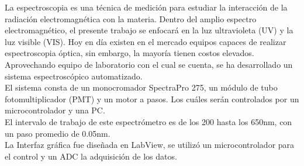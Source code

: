 \tableofcontents
\listoffigures
\listoftables
{}
La espectroscopia es una técnica de medición para estudiar la interacción de la radiación electromagnética con la materia.
Dentro del amplio espectro electromagnético, el presente trabajo se enfocará en la luz ultravioleta (UV) y la luz visible (VIS). Hoy en día existen en el mercado equipos capaces de realizar espectroscopia óptica, sin embargo, la mayoría tienen costos elevados. Aprovechando equipo de laboratorio con el cual se cuenta, se ha desarrollado un sistema espectroscópico automatizado. \\
El sistema consta de un monocromador SpectraPro 275, un módulo de tubo fotomultiplicador (PMT) y un motor a pasos. Los cuáles serán controlados por un microcontrolador y una PC.\\
El intervalo de trabajo de este espectrómetro es de los 200 hasta los 650nm, con un paso promedio de 0.05nm. \\
La Interfaz gráfica fue diseñada en LabView, se utilizó un microcontrolador para el control y un ADC la adquisición de los datos.
